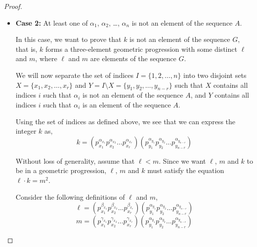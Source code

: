 \documentclass[11pt,letterpaper,twoside,english]{article}
\theoremstyle{theorem}
\theoremstyle{remark}
\begin{document}
\begin{proof}
\begin{itemize}
By comparing the exponents of primes on the left and right sides of the above expression, we obtain the following system of equations that need to hold,

\begin{align}
\alpha_1 + \beta_1 & = 2 \gamma_1 \nonumber \\
\alpha_2 + \beta_2 & = 2 \gamma_2 \nonumber \\
&\mathrel{\makebox[\widthof{=}]{\vdots}} \nonumber \\
\alpha_n + \beta_n & = 2 \gamma_n \nonumber
\end{align}

But note that $\alpha_i$, $\beta_i$ and $\gamma_i$ are members of the sequence $A$, so it is impossible for each of these equations to hold unless $\alpha_i = \beta_i = \gamma_i$. But if for all $i \in \{1, 2, \ldots, n\}$, $\alpha_i = \beta_i = \gamma_i$, then $\ell = m = k$, which is impossible since $\ell$ and $m$ were strictly less than $k$. Therefore by induction $S_G\subseteq G$. 

\item \textbf{Case 2:} At least one of $\alpha_1$, $\alpha_2$, \ldots, $\alpha_n$ is not an element of the sequence $A$.

In this case, we want to prove that $k$ is not an element of the sequence $G$, that is, $k$ forms a three-element geometric progression with some distinct $\ell$ and $m$, where $\ell$ and $m$ are elements of the sequence $G$.

We will now separate the set of indices $I = \{1, 2, \ldots, n\}$ into two disjoint sets $X = \{x_1, x_2, \ldots, x_{r}\}$ and $Y = I \setminus X = \{y_1, y_2, \ldots, y_{n - r}\}$ such that $X$ contains all indices $i$ such that $\alpha_i$ is not an element of the sequence $A$, and $Y$ contains all indices $i$ such that $\alpha_i$ is an element of the sequence $A$.

Using the set of indices as defined above, we see that we can express the integer $k$ as,
$$k = (p_{x_1}^{\alpha_{x_1}} p_{x_2}^{\alpha_{x_2}} \ldots p_{x_{r}} ^ {\alpha_{x_{r}}}) (p_{y_1}^{\alpha_{y_1}} p_{y_2}^{\alpha_{y_2}} \ldots p_{y_{n - r}}^{\alpha_{y_{n - r}}})$$

Without loss of generality, assume that $\ell < m$. Since we want $\ell$, $m$ and $k$ to be in a geometric progression, $\ell$, $m$ and $k$ must satisfy the equation $\ell \cdot k = m^2$.

Consider the following definitions of $\ell$ and $m$,
$$\ell = (p_{x_1}^{\beta_{x_1}} p_{x_2}^{\beta_{x_2}} \ldots p_{x_{r}} ^ {\beta_{x_{r}}}) (p_{y_1}^{\alpha_{y_1}} p_{y_2}^{\alpha_{y_2}} \ldots p_{y_{n - r}}^{\alpha_{y_{n - r}}})$$
$$m = (p_{x_1}^{\gamma_{x_1}} p_{x_2}^{\gamma_{x_2}} \ldots p_{x_{r}} ^ {\gamma_{x_{r}}}) (p_{y_1}^{\alpha_{y_1}} p_{y_2}^{\alpha_{y_2}} \ldots p_{y_{n - r}}^{\alpha_{y_{n - r}}})$$


\end{itemize}
\end{proof}
\end{document}
